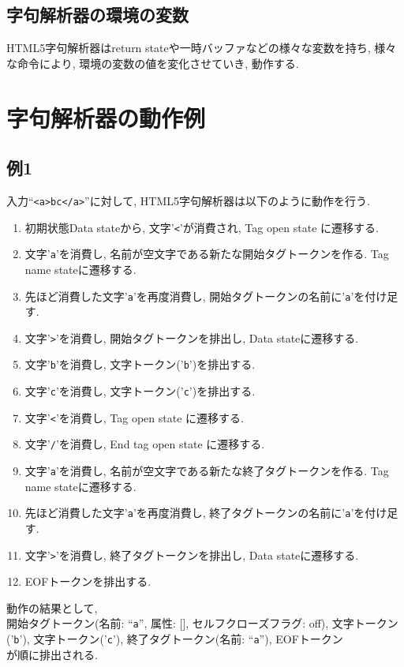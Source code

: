 \documentclass[uplatex,a4j]{jsreport}
\begin{document}
\subsection*{字句解析器の環境の変数}
HTML5字句解析器はreturn stateや一時バッファなどの様々な変数を持ち, 様々な命令により, 環境の変数の値を変化させていき, 動作する.

\section{字句解析器の動作例}
\subsection{例1}
入力``\texttt{<a>bc</a>}''に対して, HTML5字句解析器は以下のように動作を行う.\\
\begin{enumerate}
    \item 初期状態Data stateから, 文字'\texttt{<}'が消費され, Tag open state に遷移する.
    \item 文字'\texttt{a}'を消費し, 名前が空文字である新たな開始タグトークンを作る. Tag name stateに遷移する.
    \item 先ほど消費した文字'\texttt{a}'を再度消費し, 開始タグトークンの名前に'\texttt{a}'を付け足す.
    \item 文字'\texttt{>}'を消費し, 開始タグトークンを排出し, Data stateに遷移する.
    \item 文字'\texttt{b}'を消費し, 文字トークン('\texttt{b}')を排出する.
    \item 文字'\texttt{c}'を消費し, 文字トークン('\texttt{c}')を排出する.
    \item 文字'\texttt{<}'を消費し, Tag open state に遷移する.
    \item 文字'\texttt{/}'を消費し, End tag open state に遷移する.
    \item 文字'\texttt{a}'を消費し, 名前が空文字である新たな終了タグトークンを作る. Tag name stateに遷移する.
    \item 先ほど消費した文字'\texttt{a}'を再度消費し, 終了タグトークンの名前に'\texttt{a}'を付け足す.
    \item 文字'\texttt{>}'を消費し, 終了タグトークンを排出し, Data stateに遷移する.
    \item EOFトークンを排出する.
\end{enumerate}
動作の結果として,\\
開始タグトークン(名前: ``\texttt{a}'', 属性: [], セルフクローズフラグ: off), 文字トークン('\texttt{b}'), 文字トークン('\texttt{c}'), 終了タグトークン(名前: ``\texttt{a}''), EOFトークン\\
が順に排出される.
\end{document}
